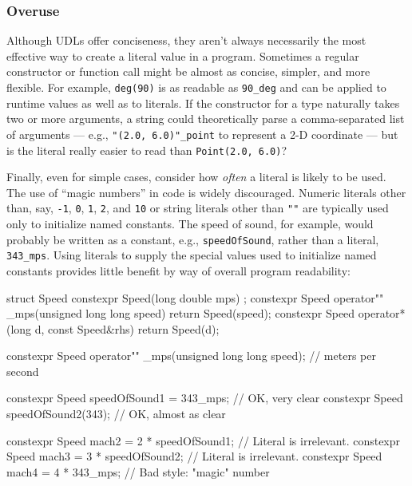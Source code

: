\subsubsection[Overuse]{Overuse}\label{overuse-defmemberinit}

Although UDLs offer conciseness, they aren't always necessarily the most effective way to create
a literal value in a program. Sometimes a regular constructor or
function call might be almost as concise, simpler, and more flexible. For
example, \lstinline!deg(90)! is as readable as \lstinline!90_deg! and can be
applied to runtime values as well as to literals. If the constructor for
a type naturally takes two or more arguments, a string  could theoretically parse a comma-separated list of arguments
--- e.g., \lstinline!"(2.0,!~\lstinline!6.0)"_point! to represent a 2-D
coordinate --- but is the literal really easier to read than
\lstinline!Point(2.0,!~\lstinline!6.0)!?

Finally, even for simple cases, consider how \emph{often} a literal is
likely to be used. The use of ``magic numbers'' in code is widely
discouraged. Numeric literals other than, say, \lstinline!-1!, \lstinline!0!,
\lstinline!1!, \lstinline!2!, and \lstinline!10! or string literals other than
\lstinline!""! are typically used only to initialize named constants. The
speed of sound, for example,  would probably be written as a constant, e.g.,
\lstinline!speedOfSound!, rather than a literal, \lstinline!343_mps!. Using literals to supply the special values used to initialize named
constants provides little benefit by way of overall program readability:

\begin{emcppshiddenlisting}[emcppsbatch=e22]
struct Speed    { constexpr Speed(long double mps) {} };
constexpr Speed operator"" _mps(unsigned long long speed) { return Speed(speed); }
constexpr Speed operator*(long d, const Speed&rhs) { return Speed(d); }
\end{emcppshiddenlisting}
\begin{emcppslisting}[emcppsbatch=e22]
constexpr Speed operator"" _mps(unsigned long long speed);  // meters per second

constexpr Speed speedOfSound1 = 343_mps;   // OK, very clear
constexpr Speed speedOfSound2(343);        // OK, almost as clear

constexpr Speed mach2 = 2 * speedOfSound1; // Literal is irrelevant.
constexpr Speed mach3 = 3 * speedOfSound2; // Literal is irrelevant.
constexpr Speed mach4 = 4 * 343_mps;       // Bad style: "magic" number
\end{emcppslisting}

